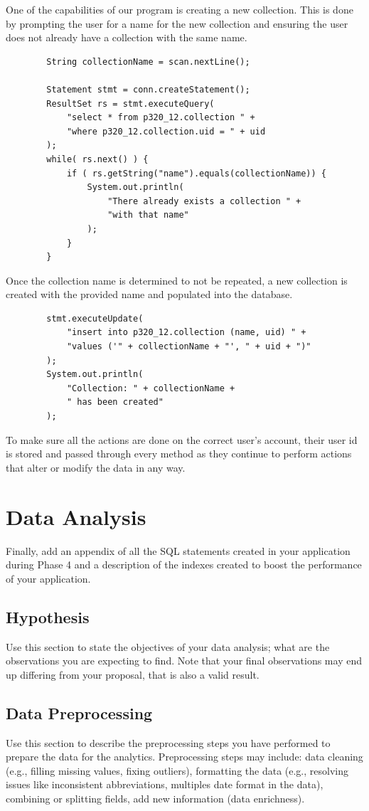 \documentclass[12pt]{article}
\begin{document}
    One of the capabilities of our program is creating a new collection.
    This is done by prompting the user for a name for the new collection
    and ensuring the user does not already have a collection with the same
    name.
    \begin{lstlisting}
        String collectionName = scan.nextLine();

        Statement stmt = conn.createStatement();
        ResultSet rs = stmt.executeQuery(
            "select * from p320_12.collection " +
            "where p320_12.collection.uid = " + uid
        );
        while( rs.next() ) {
            if ( rs.getString("name").equals(collectionName)) {
                System.out.println(
                    "There already exists a collection " +
                    "with that name"
                );
            }
        }
    \end{lstlisting}
    Once the collection name is determined to not be repeated, a new collection
    is created with the provided name and populated into the database.
    \begin{lstlisting}
        stmt.executeUpdate(
            "insert into p320_12.collection (name, uid) " +
            "values ('" + collectionName + "', " + uid + ")"
        );
        System.out.println(
            "Collection: " + collectionName +
            " has been created"
        );
    \end{lstlisting}
    To make sure all the actions are done on the correct user's account, their
    user id is stored and passed through every method as they continue to perform
    actions that alter or modify the data in any way.



    \section{Data Analysis}
    Finally, add an appendix of all the SQL statements
    created in your application during Phase 4 and a description of the indexes created to
    boost the performance of your application.
    \subsection{Hypothesis}
    Use this section to state the objectives of your data analysis; what are the observations you are expecting to find. Note that your final
    observations may end up differing from your proposal, that is also a valid result.
    \subsection{Data Preprocessing}
    Use this section to describe the preprocessing steps you have performed to prepare the data for the analytics. Preprocessing steps may include: data cleaning (e.g., filling missing values, fixing outliers), formatting the data (e.g., resolving issues like inconsistent abbreviations, multiples date format in the data), combining or splitting fields, add new information (data enrichness).
\end{document}
